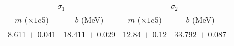 \begin{tabular}{cc|cc}
\multicolumn{2}{c|}{$\sigma_1$} & \multicolumn{2}{|c}{$\sigma_2$} \\
$m$ ($\times1e5$) & $b$ (MeV) & $m$ ($\times1e5$) & $b$ (MeV) \\
\hline
8.611 $\pm$ 0.041 & 18.411 $\pm$ 0.029 & 12.84 $\pm$ 0.12 & 33.792 $\pm$ 0.087\\
\end{tabular}
